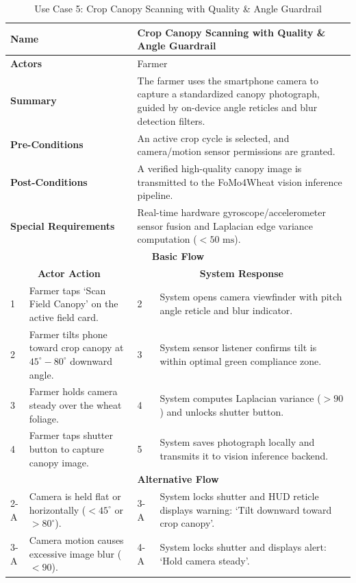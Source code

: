 \begin{table}[H]
\small
\centering
\caption{Use Case 5: Crop Canopy Scanning with Quality \& Angle Guardrail}
\label{tab:uc5}
\begin{tabular}{|p{0.6cm}|p{6.4cm}|p{0.8cm}|p{6.6cm}|}
\hline
\multicolumn{2}{|p{7.0cm}|}{\textbf{Name}} & \multicolumn{2}{p{7.4cm}|}{Crop Canopy Scanning with Quality \& Angle Guardrail} \\ \hline
\multicolumn{2}{|p{7.0cm}|}{\textbf{Actors}} & \multicolumn{2}{p{7.4cm}|}{Farmer} \\ \hline
\multicolumn{2}{|p{7.0cm}|}{\textbf{Summary}} & \multicolumn{2}{p{7.4cm}|}{The farmer uses the smartphone camera to capture a standardized canopy photograph, guided by on-device angle reticles and blur detection filters.} \\ \hline
\multicolumn{2}{|p{7.0cm}|}{\textbf{Pre-Conditions}} & \multicolumn{2}{p{7.4cm}|}{An active crop cycle is selected, and camera/motion sensor permissions are granted.} \\ \hline
\multicolumn{2}{|p{7.0cm}|}{\textbf{Post-Conditions}} & \multicolumn{2}{p{7.4cm}|}{A verified high-quality canopy image is transmitted to the FoMo4Wheat vision inference pipeline.} \\ \hline
\multicolumn{2}{|p{7.0cm}|}{\textbf{Special Requirements}} & \multicolumn{2}{p{7.4cm}|}{Real-time hardware gyroscope/accelerometer sensor fusion and Laplacian edge variance computation ($< 50\text{ ms}$).} \\ \hline
\multicolumn{4}{|c|}{\textbf{Basic Flow}} \\ \hline
\multicolumn{2}{|c|}{\textbf{Actor Action}} & \multicolumn{2}{c|}{\textbf{System Response}} \\ \hline
1 & Farmer taps `Scan Field Canopy' on the active field card. & 2 & System opens camera viewfinder with pitch angle reticle and blur indicator. \\ \hline
2 & Farmer tilts phone toward crop canopy at $45^\circ - 80^\circ$ downward angle. & 3 & System sensor listener confirms tilt is within optimal green compliance zone. \\ \hline
3 & Farmer holds camera steady over the wheat foliage. & 4 & System computes Laplacian variance ($> 90$) and unlocks shutter button. \\ \hline
4 & Farmer taps shutter button to capture canopy image. & 5 & System saves photograph locally and transmits it to vision inference backend. \\ \hline
\multicolumn{4}{|c|}{\textbf{Alternative Flow}} \\ \hline
2-A & Camera is held flat or horizontally ($< 45^\circ$ or $> 80^\circ$). & 3-A & System locks shutter and HUD reticle displays warning: `Tilt downward toward crop canopy'. \\ \hline
3-A & Camera motion causes excessive image blur ($< 90$). & 4-A & System locks shutter and displays alert: `Hold camera steady'. \\ \hline
\end{tabular}
\end{table}

